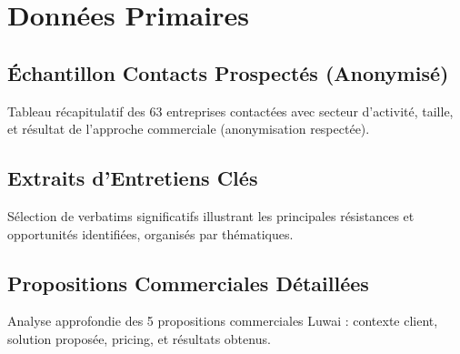 \chapter{Données Primaires}
\label{app:donnees}

\section{Échantillon Contacts Prospectés (Anonymisé)}
Tableau récapitulatif des 63 entreprises contactées avec secteur d'activité, taille, et résultat de l'approche commerciale (anonymisation respectée).

\section{Extraits d'Entretiens Clés}
Sélection de verbatims significatifs illustrant les principales résistances et opportunités identifiées, organisés par thématiques.

\section{Propositions Commerciales Détaillées}
Analyse approfondie des 5 propositions commerciales Luwai : contexte client, solution proposée, pricing, et résultats obtenus.
